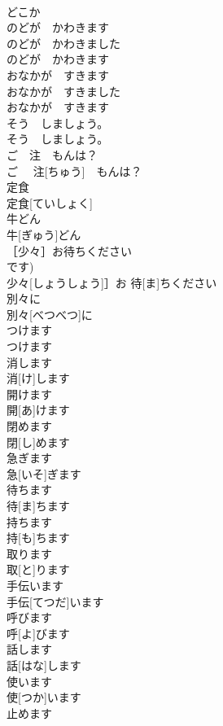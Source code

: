 \documentclass[8pt]{extreport}
\begin{document}
\begin{CJK}{UTF8}{min}
\\	どこか	
\\	のどが　かわきます	
\\	のどが　かわきました　
\\	のどが　かわきます	
\\	おなかが　すきます	
\\	おなかが　すきました　
\\	おなかが　すきます	
\\	そう　しましょう。	
\\	そう　しましょう。	
\\	ご　注　もんは？	
\\	ご　 注[ちゅう]　もんは？	
\\	定食	
\\	定食[ていしょく]	
\\	牛どん	
\\	牛[ぎゅう]どん	
\\	［少々］お待ちください	
\\	です)	
\\	少々[しょうしょう]］お 待[ま]ちください	
\\	別々に	
\\	別々[べつべつ]に	
\\	つけます	
\\	つけます	
\\	消します	
\\	消[け]します	
\\	開けます	
\\	開[あ]けます	
\\	閉めます	
\\	閉[し]めます	
\\	急ぎます	
\\	急[いそ]ぎます	
\\	待ちます	
\\	待[ま]ちます	
\\	持ちます	
\\	持[も]ちます	
\\	取ります	
\\	取[と]ります	
\\	手伝います	
\\	手伝[てつだ]います	
\\	呼びます	
\\	呼[よ]びます	
\\	話します	
\\	話[はな]します	
\\	使います	
\\	使[つか]います	
\\	止めます	

\end{CJK}
\end{document}
